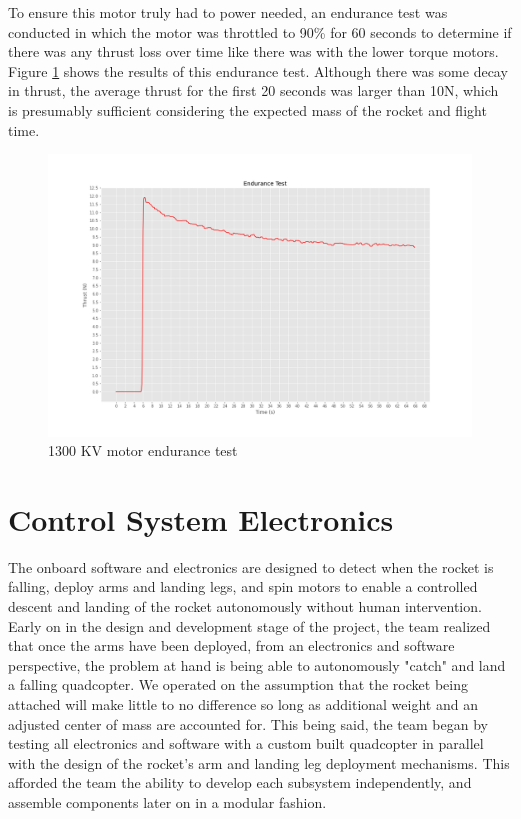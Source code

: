 To ensure this motor truly had to power needed, an endurance test was conducted in which the motor was throttled to 90\% for 60 seconds to determine if there was any thrust loss over time like there was with the lower torque motors. Figure \ref{design:sts:endurance} shows the results of this endurance test. Although there was some decay in thrust, the average thrust for the first 20 seconds was larger than 10N, which is presumably sufficient considering the expected mass of the rocket and flight time.
\begin{figure}[H]
    \centering
    \includegraphics[width=\textwidth]{src/figs/purple_endurance.png}
    \caption{1300 KV motor endurance test}
    \label{design:sts:endurance}
\end{figure}


\section{Control System Electronics}
The onboard software and electronics are designed to detect when the rocket is falling, deploy arms and landing legs, and spin motors to enable a controlled descent and landing of the rocket autonomously without human intervention. Early on in the design and development stage of the project, the team realized that once the arms have been deployed, from an electronics and software perspective, the problem at hand is being able to autonomously "catch" and land a falling quadcopter. We operated on the assumption that the rocket being attached will make little to no difference so long as additional weight and an adjusted center of mass are accounted for. This being said, the team began by testing all electronics and software with a custom built quadcopter in parallel with the design of the rocket's arm and landing leg deployment mechanisms. This afforded the team the ability to develop each subsystem independently, and assemble components later on in a modular fashion.

